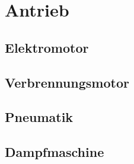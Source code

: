 \section{Antrieb}

\subsection{Elektromotor}

\subsection{Verbrennungsmotor}

\subsection{Pneumatik}

\subsection{Dampfmaschine}
